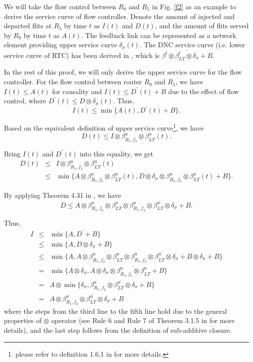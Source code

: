 \documentclass[preprint]{elsarticle}
\begin{document}
\begin{pf}
We will take the flow control between $R_9$ and $R_5$ in Fig. \ref{f2} as an example to derive the service curve of flow controller. Denote the amount of injected and departed flits at $R_5$ by time $t$ as $I(t)$ and $D(t)$, and the amount of flits served by $R_9$ by time $t$ as $A(t)$. The feedback link can be represented as a network element providing upper service curve $\delta_\sigma(t)$. The DNC service curve (i.e. lower service curve of RTC) has been derived in \cite{qian2009analysis}, which is $\overline{\beta^l\otimes\beta_{LT}^l\otimes\delta_{\sigma}+B}$.

In the rest of this proof, we will only derive the upper service curve for the flow controller. For the flow control between router $R_9$ and $R_5$, we have $I(t)\leq A(t)$ for causality and $I(t)\leq D^\prime(t)+B$ due to the effect of flow control, where $D^\prime(t)\leq D\otimes\delta_\sigma(t)$. Thus, $$I(t)\leq\min\{A(t),D^\prime(t)+B\}.$$

Based on the equivalent definition of upper service curve\footnote{please refer to definition 1.6.1 in \cite{Boudec2001Network} for more details.}, we have
$$D(t)\leq I\otimes \beta_{R_5,f_2}^u\otimes\beta_{LT}^u(t).$$

Bring $I(t)$ and $D^\prime(t)$ into this equality, we get
\begin{eqnarray*}
D(t)&\leq& I\otimes \beta_{R_5,f_2}^u\otimes\beta_{LT}^u(t)\\
&\leq& \min\{A\otimes \beta^u_{R_5,f_2}\otimes\beta_{LT}^u(t),D\otimes\delta_\sigma\otimes \beta_{R_5,f_2}^u\otimes\beta_{LT}^u(t)+B\}.
\end{eqnarray*}

By applying Theorem 4.31 in \cite{Boudec2001Network}, we have
$$D\leq A\otimes \beta^u_{R_5,f_2}\otimes\beta_{LT}^u\otimes\overline{\beta_{R_5,f_2}^u\otimes\beta_{LT}^u\otimes\delta_\sigma+B}.$$

Thus,
\begin{eqnarray*}
  I&\leq& \min\{A,D^\prime+B\}\\
  &\leq& \min\{A,D\otimes\delta_\sigma+B\}\\
  &\leq& \min\{A,A\otimes \beta^u_{R_5,f_2}\otimes\beta_{LT}^u\otimes\overline{\beta_{R_5,f_2}^u\otimes\beta_{LT}^u\otimes\delta_\sigma+B}\otimes\delta_\sigma+B\}\\
  &=& \min\{A\otimes \delta_\sigma,A\otimes \overline{\delta_\sigma\otimes\beta_{R_5,f_2}^u\otimes\beta_{LT}^u+B}\}\\
  &=& A\otimes\min\{\delta_\sigma,\overline{\beta_{R_5,f_2}^u\otimes\beta_{LT}^u\otimes\delta_\sigma+B}\}\\
  &=& A\otimes\overline{\beta_{R_5,f_2}^u\otimes\beta_{LT}^u\otimes\delta_\sigma+B}
\end{eqnarray*}
where the steps from the third line to the fifth line hold due to the general properties of $\otimes$ operator (see Rule 6 and Rule 7 of Theorem 3.1.5 in \cite{Boudec2001Network} for more details), and the last step follows from the definition of sub-additive closure.


\end{pf}
\end{document}

